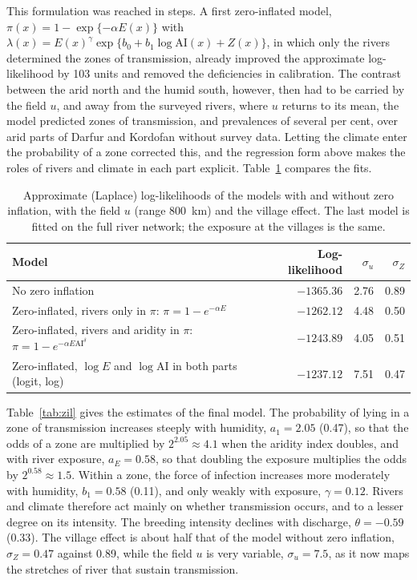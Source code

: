 \documentclass[11pt,a4paper]{article}
\newcommand{\AI}{\mathrm{AI}}
\begin{document}
This formulation was reached in steps. A first zero-inflated model, $\pi(x) = 1 - \exp\{-\alpha E(x)\}$ with $\lambda(x) = E(x)^{\gamma} \exp\{b_0 + b_1 \log\AI(x) + Z(x)\}$, in which only the rivers determined the zones of transmission, already improved the approximate log-likelihood by 103 units and removed the deficiencies in calibration. The contrast between the arid north and the humid south, however, then had to be carried by the field $u$, and away from the surveyed rivers, where $u$ returns to its mean, the model predicted zones of transmission, and prevalences of several per cent, over arid parts of Darfur and Kordofan without survey data. Letting the climate enter the probability of a zone corrected this, and the regression form above makes the roles of rivers and climate in each part explicit. Table~\ref{tab:zi} compares the fits.

\begin{table}[H]
\centering
\caption{Approximate (Laplace) log-likelihoods of the models with and without zero inflation, with the field $u$ (range 800~km) and the village effect. The last model is fitted on the full river network; the exposure at the villages is the same.}
\label{tab:zi}
\begin{tabular}{lrrr}
\toprule
Model & Log-likelihood & $\sigma_u$ & $\sigma_Z$ \\
\midrule
No zero inflation & $-1365.36$ & 2.76 & 0.89 \\
Zero-inflated, rivers only in $\pi$: $\pi = 1 - e^{-\alpha E}$ & $-1262.12$ & 4.48 & 0.50 \\
Zero-inflated, rivers and aridity in $\pi$: $\pi = 1 - e^{-\alpha E \AI^{\delta}}$ & $-1243.89$ & 4.05 & 0.51 \\
Zero-inflated, $\log E$ and $\log\AI$ in both parts (logit, log) & $-1237.12$ & 7.51 & 0.47 \\
\bottomrule
\end{tabular}
\end{table}

Table~\ref{tab:zil} gives the estimates of the final model. The probability of lying in a zone of transmission increases steeply with humidity, $a_1 = 2.05$ (0.47), so that the odds of a zone are multiplied by $2^{2.05} \approx 4.1$ when the aridity index doubles, and with river exposure, $a_E = 0.58$, so that doubling the exposure multiplies the odds by $2^{0.58} \approx 1.5$. Within a zone, the force of infection increases more moderately with humidity, $b_1 = 0.58$ (0.11), and only weakly with exposure, $\gamma = 0.12$. Rivers and climate therefore act mainly on whether transmission occurs, and to a lesser degree on its intensity. The breeding intensity declines with discharge, $\theta = -0.59$ (0.33). The village effect is about half that of the model without zero inflation, $\sigma_Z = 0.47$ against 0.89, while the field $u$ is very variable, $\sigma_u = 7.5$, as it now maps the stretches of river that sustain transmission.
\end{document}
